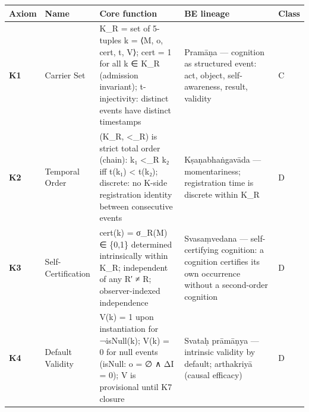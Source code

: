 \documentclass[
  11pt,
]{article}
\newcounter{none} %
\begin{document}
{\def\LTcaptype{none} %
\begin{longtable}[]{@{}
  >{\raggedright\arraybackslash}p{}
  >{\raggedright\arraybackslash}p{}
  >{\raggedright\arraybackslash}p{}
  >{\raggedright\arraybackslash}p{}
  >{\raggedright\arraybackslash}p{}@{}}
\toprule\noalign{}
\begin{minipage}[b]{\linewidth}\raggedright
Axiom
\end{minipage} & \begin{minipage}[b]{\linewidth}\raggedright
Name
\end{minipage} & \begin{minipage}[b]{\linewidth}\raggedright
Core function
\end{minipage} & \begin{minipage}[b]{\linewidth}\raggedright
BE lineage
\end{minipage} & \begin{minipage}[b]{\linewidth}\raggedright
Class
\end{minipage} \\
\midrule\noalign{}
\endhead
\bottomrule\noalign{}
\endlastfoot
\textbf{K1} & Carrier Set & K\_R = set of 5-tuples k = ⟨M, o, cert, t,
V⟩; cert = 1 for all k ∈ K\_R (admission invariant); t-injectivity:
distinct events have distinct timestamps & Pramāṇa --- cognition as
structured event: act, object, self-awareness, result, validity & C \\
\textbf{K2} & Temporal Order & (K\_R, \textless\_R) is strict total
order (chain): k₁ \textless\_R k₂ iff t(k₁) \textless{} t(k₂); discrete:
no K-side registration identity between consecutive events &
Kṣaṇabhaṅgavāda --- momentariness; registration time is discrete within
K\_R & D \\
\textbf{K3} & Self-Certification & cert(k) = σ\_R(M) ∈ \{0,1\}
determined intrinsically within K\_R; independent of any R′ ≠ R;
observer-indexed independence & Svasaṃvedana --- self-certifying
cognition: a cognition certifies its own occurrence without a
second-order cognition & D \\
\textbf{K4} & Default Validity & V(k) = 1 upon instantiation for
¬isNull(k); V(k) = 0 for null events (isNull: o = ∅ ∧ ΔI = 0); V is
provisional until K7 closure & Svataḥ prāmāṇya --- intrinsic validity by
default; arthakriyā (causal efficacy) & D \\

\end{longtable}}
\end{document}
